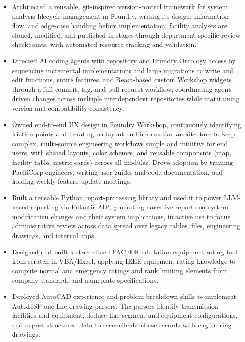 \documentclass[10pt, letterpaper]{article}
\newenvironment{rlist}{%
  \begin{itemize}[leftmargin=1.4em, itemsep=1pt, topsep=2pt, parsep=0pt]%
}{%
  \end{itemize}%
}
\begin{document}
\begin{rlist}
  \item Architected a reusable, git-inspired version-control framework for system analysis lifecycle management in Foundry, writing its design, information flow, and edge-case handling before implementation: facility analyses are cloned, modified, and published in stages through department-specific review checkpoints, with automated resource tracking and validation.
  \item Directed AI coding agents with repository and Foundry Ontology access by sequencing incremental implementations and large migrations to write and edit functions, entire features, and React-based custom Workshop widgets through a full commit, tag, and pull-request workflow, coordinating agent-driven changes across multiple interdependent repositories while maintaining version and compatibility consistency.
  \item Owned end-to-end UX design in Foundry Workshop, continuously identifying friction points and iterating on layout and information architecture to keep complex, multi-source engineering workflows simple and intuitive for end users, with shared layouts, color schemes, and reusable components (map, facility table, metric cards) across all modules. Drove adoption by training PacifiCorp engineers, writing user guides and code documentation, and holding weekly feature-update meetings.
  \item Built a reusable Python report-processing library and used it to power LLM-based reporting via Palantir AIP, generating narrative reports on system modification changes and their system implications, in active use to focus administrative review across data spread over legacy tables, files, engineering drawings, and internal apps.
  \item Designed and built a streamlined FAC-008 substation equipment rating tool from scratch in VBA/Excel, applying IEEE equipment-rating knowledge to compute normal and emergency ratings and rank limiting elements from company standards and nameplate specifications.
  \item Deployed AutoCAD experience and problem breakdown skills to implement AutoLISP one-line-drawing parsers. The parsers identify transmission facilities and equipment, deduce line segment and equipment configurations, and export structured data to reconcile database records with engineering drawings.
\end{rlist}
\end{document}

